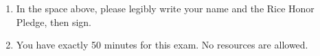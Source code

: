 \begin{enumerate}
\item In the space above, please legibly write your name and the Rice Honor Pledge, then sign.
\item You have exactly 50 minutes for this exam. No resources are allowed.
\end{enumerate}
